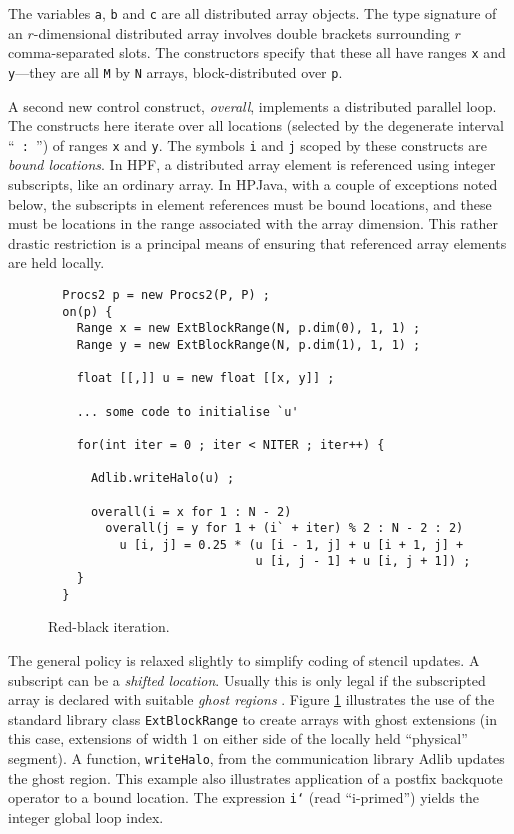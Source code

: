 \documentclass{article}
\begin{document}
The variables {\tt a}, {\tt b} and {\tt c} are all distributed array
objects.  The type signature of an $r$-dimensional distributed array
involves double brackets surrounding $r$ comma-separated slots.  The
constructors specify that these all have ranges {\tt x} and {\tt y}---they
are all {\tt M} by {\tt N} arrays, block-distributed over {\tt p}.

A second new control construct, {\em overall}, implements a distributed
parallel loop.  The
constructs here iterate over all locations (selected by the degenerate
interval ``\verb$ : $'') of ranges \verb$x$ and \verb$y$.  The symbols
{\tt i} and {\tt j} scoped by these constructs are {\em bound
locations}.  In HPF, a distributed array element is referenced using
integer subscripts, like an ordinary array.  In HPJava, with a couple
of exceptions noted below, the subscripts in element references must be
bound locations, and these must be locations in the range associated
with the array dimension.  This rather drastic restriction is a
principal means of ensuring that referenced array elements are held
locally.

\begin{figure}[btp]

\small
\begin{verbatim}
  Procs2 p = new Procs2(P, P) ;
  on(p) {
    Range x = new ExtBlockRange(N, p.dim(0), 1, 1) ;
    Range y = new ExtBlockRange(N, p.dim(1), 1, 1) ;

    float [[,]] u = new float [[x, y]] ;

    ... some code to initialise `u'

    for(int iter = 0 ; iter < NITER ; iter++) {

      Adlib.writeHalo(u) ;

      overall(i = x for 1 : N - 2)
        overall(j = y for 1 + (i` + iter) % 2 : N - 2 : 2)
          u [i, j] = 0.25 * (u [i - 1, j] + u [i + 1, j] +
                             u [i, j - 1] + u [i, j + 1]) ;
    }
  }
\end{verbatim}
\normalsize

\caption{\label{fig:redBlack}Red-black iteration.}
\end{figure}

The general policy is relaxed slightly to simplify coding of stencil
updates.  A subscript can be a {\em shifted location}.  Usually
this is only legal if the subscripted array is declared with suitable {\em
ghost regions} \cite{Ghost}.  Figure \ref{fig:redBlack} illustrates the
use of the standard library class {\tt ExtBlockRange} to create arrays with
ghost extensions (in this case, extensions of width 1 on either side of
the locally held ``physical'' segment).  A function, {\tt writeHalo}, from
the communication library Adlib updates the ghost region.  This example
also illustrates application of a postfix backquote operator to a bound
location.  The expression {\tt i`} (read ``i-primed'') yields the integer
global loop index.
\end{document}
